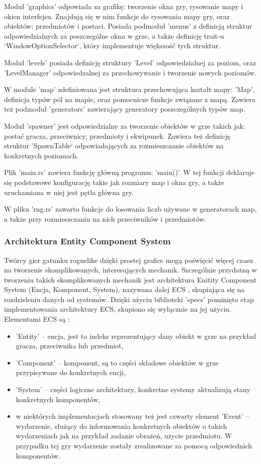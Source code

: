 \documentclass[12pt,twoside]{article}
\begin{document}
Moduł 'graphics' odpowiada za grafikę: tworzenie okna gry, rysowanie mapy i okien interfejsu. Znajdują się w nim funkcje do rysowania mapy gry, oraz obiektów: przedmiotów i postaci. Posiada podmoduł 'menus' z definicją struktur odpowiedzialnych za poszczególne okna w grze, a także definicję trait-u `WindowOptionSelector`, który implementuje większość tych struktur.

Moduł 'levels' posiada definicję struktury 'Level' odpowiedzialnej za poziom, oraz 'LevelManager' odpowiedzalnej za przechowywanie i tworzenie nowych poziomów.

W module 'map' zdefiniowana jest struktura przechowująca kształt mapy: 'Map', definicja typów pól na mapie, oraz pomocnicze funkcje związane z mapą. Zawiera też podmoduł 'generators' zawierający generatory poszczególnych typów map.

Moduł 'spawner' jest odpowiedzialny za tworzenie obiektów w grze takich jak: postać gracza, przeciwnicy, przedmioty i ekwipunek. Zawiera też definicję struktur 'SpawnTable` odpowiadających za rozmieszczanie obiektów na konkretnych poziomach.

Plik 'main.rs' zawiera funkcję główną programu: 'main()'. W tej funkcji deklaruje się podstawowe konfigurację takie jak rozmiary map i okna gry, a także uruchamiana w niej jest pętla główna gry.
 
W pliku 'rng.rs' zawarto funkcje do losowania liczb używane w generatorach map, a także przy rozmieszczaniu na nich przeciwników i przedmiotów.

\subsubsection{Architektura Entity Component System}
Twórcy gier gatunku roguelike dzięki prostej grafice mogą poświęcić więcej czasu na tworzenie skomplikowanych, interesujących mechanik. Szczególnie przydatną w tworzeniu takich skomplikowanych mechanik jest architektura Enitity Component System (Encja, Komponent, System), nazywana dalej ECS \cite{ecs_source}, skupiająca się na rozdzieleniu danych od systemów. Dzięki użyciu biblioteki 'specs' pominięto etap implementowania architektury ECS, skupiono się wyłącznie na jej użyciu. Elementami ECS są :

\begin{itemize}
	\item 'Entity' -- encja, jest to indeks reprezentujący dany obiekt w grze na przykład gracza, przeciwnika lub przedmiot,
	\item 'Component' -- komponent, są to części składowe obiektów w grze przypisywane do konkretnych encji,
	\item 'System' -- części logiczne architektury, konkretne systemy aktualizują stany konkretnych komponentów,
	\item w niektórych implementacjach stosowany też jest czwarty element 'Event' -- wydarzenie, służący do informowania konkretnych obiektów o takich wydarzeniach jak na przykład zadanie obrażeń, użycie przedmiotu. W przypadku tej gry wydarzenie zostały zrealizowane za pomocą odpowiednich komponentów.
\end{itemize}
	
\end{document}
